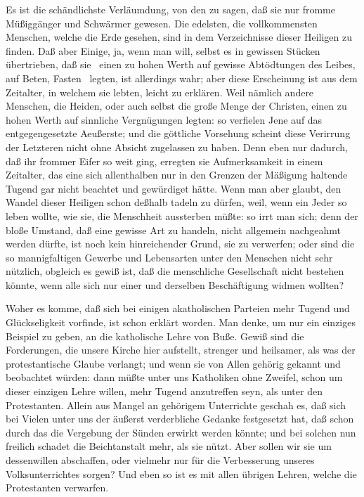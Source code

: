 \begin{aufza}
\begin{aufzb}
\item Es ist die schändlichste Verläumdung, von den  zu sagen, daß sie nur fromme Müßiggänger und Schwärmer gewesen. Die edelsten, die vollkommensten Menschen, welche die Erde gesehen, sind in dem Verzeichnisse dieser Heiligen zu finden. Daß aber Einige, ja, wenn man will, selbst  es in gewissen Stücken übertrieben, daß sie \zB\ einen zu hohen Werth auf gewisse Abtödtungen des Leibes, auf Beten, Fasten \udgl\  legten, ist allerdings wahr; aber diese Erscheinung ist aus dem Zeitalter, in welchem sie lebten, leicht zu erklären. Weil nämlich andere Menschen, die Heiden, oder auch selbst die große Menge der Christen, einen zu hohen Werth auf sinnliche Vergnügungen legten: so verfielen Jene auf das entgegengesetzte Aeußerste; und die göttliche Vorsehung scheint diese Verirrung der Letzteren nicht ohne Absicht zugelassen zu haben. Denn eben nur dadurch, daß ihr frommer Eifer so weit ging, erregten sie Aufmerksamkeit in einem Zeitalter, das eine sich allenthalben nur in den Grenzen der Mäßigung haltende Tugend gar nicht beachtet und gewürdiget hätte. Wenn man aber glaubt, den Wandel dieser Heiligen schon deßhalb tadeln zu dürfen, weil, wenn ein Jeder so leben wollte, wie sie, die Menschheit aussterben müßte: so irrt man sich; denn der bloße Umstand, daß eine gewisse Art zu handeln, nicht allgemein nachgeahmt werden dürfte, ist noch kein hinreichender Grund, sie zu verwerfen; oder sind die so mannigfaltigen Gewerbe und Lebensarten unter den Menschen nicht sehr nützlich, obgleich es gewiß ist, daß die menschliche Gesellschaft nicht bestehen könnte, wenn alle sich nur einer und derselben Beschäftigung widmen wollten?
\item Woher es komme, daß sich bei einigen akatholischen Parteien mehr Tugend und Glückseligkeit vorfinde, ist schon erklärt worden. Man denke, um nur ein einziges Beispiel zu geben, an die katholische Lehre von Buße. Gewiß sind die Forderungen, die unsere Kirche hier aufstellt, strenger und heilsamer, als was der protestantische Glaube verlangt; und wenn sie von Allen gehörig gekannt und beobachtet würden: dann müßte unter uns Katholiken ohne Zweifel, schon um dieser einzigen Lehre willen, mehr Tugend anzutreffen seyn, als unter den Protestanten. Allein aus Mangel an gehörigem Unterrichte geschah es, daß sich bei Vielen unter uns der äußerst verderbliche Gedanke festgesetzt hat, daß schon durch das  die Vergebung der Sünden erwirkt werden könnte; und bei solchen nun freilich schadet die Beichtanstalt mehr, als sie nützt. Aber sollen wir sie um dessenwillen abschaffen, oder vielmehr nur für die Verbesserung unseres Volksunterrichtes sorgen? Und eben so ist es mit allen übrigen Lehren, welche die Protestanten verwarfen.

\end{aufzb}
\end{aufza}
